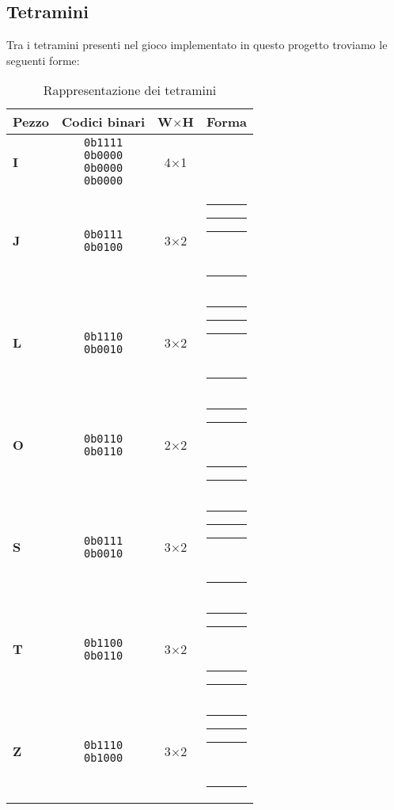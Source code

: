 \documentclass[a4paper, 12pt]{article}
\newcommand{\RedBlock}{\colorbox{red}{\rule{1.2ex}{1.2ex}}}      %
\newcommand{\WhiteBlock}{\fcolorbox{black}{white}{\rule{1.2ex}{1.2ex}}} %
\begin{document}
\subsection{Tetramini}
Tra i tetramini presenti nel gioco implementato in questo progetto troviamo le seguenti forme:
\begin{table}[ht]
    \centering
    \caption{Rappresentazione dei tetramini}
    \begin{tabular}{  
      >{\bfseries}l   %
      c               %
      c               %
      l               %
    }
      \toprule
      Pezzo & Codici binari & W\(\times\)H & Forma \\
      \midrule
      I   & \makecell{\texttt{0b1111}\\\texttt{0b0000}\\\texttt{0b0000}\\\texttt{0b0000}} 
          & 4\(\times\)1 
          & \makecell{\RedBlock\RedBlock\RedBlock\RedBlock} \\
      \addlinespace
      J   & \makecell{\texttt{0b0111}\\\texttt{0b0100}} 
          & 3\(\times\)2 
          & \makecell{\WhiteBlock\RedBlock\RedBlock\RedBlock\\\WhiteBlock\RedBlock\WhiteBlock\WhiteBlock} \\
      \addlinespace
      L   & \makecell{\texttt{0b1110}\\\texttt{0b0010}} 
          & 3\(\times\)2 
          & \makecell{\RedBlock\RedBlock\RedBlock\WhiteBlock\\\WhiteBlock\RedBlock\WhiteBlock\WhiteBlock} \\
      \addlinespace
      O   & \makecell{\texttt{0b0110}\\\texttt{0b0110}} 
          & 2\(\times\)2 
          & \makecell{\WhiteBlock\RedBlock\RedBlock\WhiteBlock\\\WhiteBlock\RedBlock\RedBlock\WhiteBlock} \\
      \addlinespace
      S   & \makecell{\texttt{0b0111}\\\texttt{0b0010}} 
          & 3\(\times\)2 
          & \makecell{\WhiteBlock\RedBlock\RedBlock\RedBlock\\\WhiteBlock\WhiteBlock\RedBlock\WhiteBlock} \\
      \addlinespace
      T   & \makecell{\texttt{0b1100}\\\texttt{0b0110}} 
          & 3\(\times\)2 
          & \makecell{\RedBlock\RedBlock\WhiteBlock\WhiteBlock\\\WhiteBlock\RedBlock\RedBlock\WhiteBlock} \\
      \addlinespace
      Z   & \makecell{\texttt{0b1110}\\\texttt{0b1000}} 
          & 3\(\times\)2 
          & \makecell{\RedBlock\RedBlock\RedBlock\WhiteBlock\\\RedBlock\WhiteBlock\WhiteBlock\WhiteBlock} \\
      \bottomrule
    \end{tabular}
  \end{table}
\end{document}
